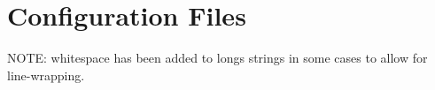 \section{Configuration Files}
NOTE: whitespace has been added to longs strings in some cases to allow for line-wrapping.
\label{netl-configuration}






